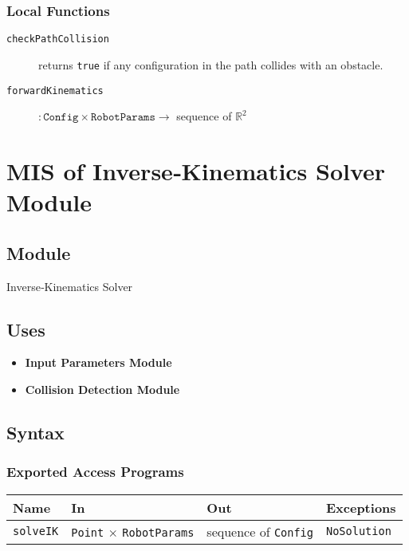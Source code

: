 \documentclass[12pt, titlepage]{article}
\begin{document}
\subsubsection{Local Functions}
\begin{description}
  \item[\texttt{checkPathCollision}] returns \texttt{true} if any configuration in the path collides with an obstacle.
  \item[\texttt{forwardKinematics}] $\!:\! \texttt{Config} \times \texttt{RobotParams} \rightarrow$ sequence of $\mathbb{R}^2$
\end{description}

\newpage



\section{MIS of Inverse‑Kinematics Solver Module}
\label{mod:ik}

\subsection{Module}
Inverse‑Kinematics Solver

\subsection{Uses}
\begin{itemize}
  \item \textbf{Input Parameters Module}
  \item \textbf{Collision Detection Module}
\end{itemize}

\subsection{Syntax}
\subsubsection{Exported Access Programs}
\begin{center}
\renewcommand{\arraystretch}{1.3}
\begin{tabular}{p{3.2cm} p{6cm} p{3cm} p{3cm}}
\toprule
\textbf{Name} & \textbf{In} & \textbf{Out} & \textbf{Exceptions}\\ \midrule
\texttt{solveIK} & \texttt{Point} $\times$ \texttt{RobotParams} & sequence of \texttt{Config} & \texttt{NoSolution}\\
\bottomrule
\end{tabular}
\end{center}
\end{document}
